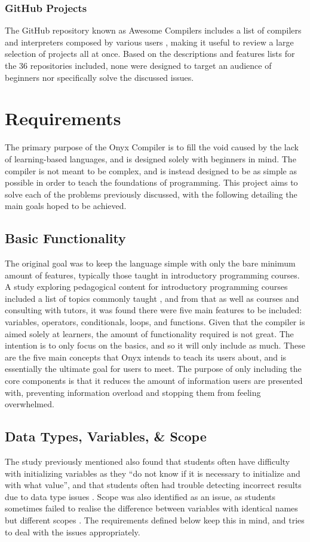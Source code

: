 \documentclass[
]{report}
\begin{document}
\subsection{GitHub Projects}
The GitHub repository known as Awesome Compilers includes a list of 
compilers and interpreters composed by various users \cite{compilers-github}, 
making it useful to review a large selection of projects all at once. 
Based on the descriptions and features lists for the 36 repositories 
included, none were designed to target an audience of beginners nor 
specifically solve the discussed issues.

\chapter{Requirements}
The primary purpose of the Onyx Compiler is to fill the void caused by
the lack of learning-based languages, and is designed solely with
beginners in mind. The compiler is not meant to be complex, and is
instead designed to be as simple as possible in order to teach the
foundations of programming. This project aims to solve each of the
problems previously discussed, with the following detailing the main
goals hoped to be achieved.

\section{Basic Functionality}
The original goal was to keep the language simple with only the bare
minimum amount of features, typically those taught in introductory
programming courses. A study exploring pedagogical content for
introductory programming courses included a list of topics commonly
taught \cite{pedagogical-report}, and from that as well as courses and consulting with
tutors, it was found there were five main features to be included:
variables, operators, conditionals, loops, and functions. Given that the
compiler is aimed solely at learners, the amount of functionality
required is not great. The intention is to only focus on the basics, and
so it will only include as much. These are the five main concepts that
Onyx intends to teach its users about, and is essentially the ultimate
goal for users to meet. The purpose of only including the core
components is that it reduces the amount of information users are
presented with, preventing information overload and stopping them from
feeling overwhelmed.

\section{Data Types, Variables, \& Scope}
The study previously mentioned also found that students often have
difficulty with initializing variables as they ``do not know if it is
necessary to initialize and with what value'', and that students often
had trouble detecting incorrect results due to data type issues
\cite{pedagogical-report}. Scope was also identified as an issue, as students sometimes
failed to realise the difference between variables with identical names
but different scopes \cite{pedagogical-report}. The requirements defined below keep this
in mind, and tries to deal with the issues appropriately.
\end{document}
